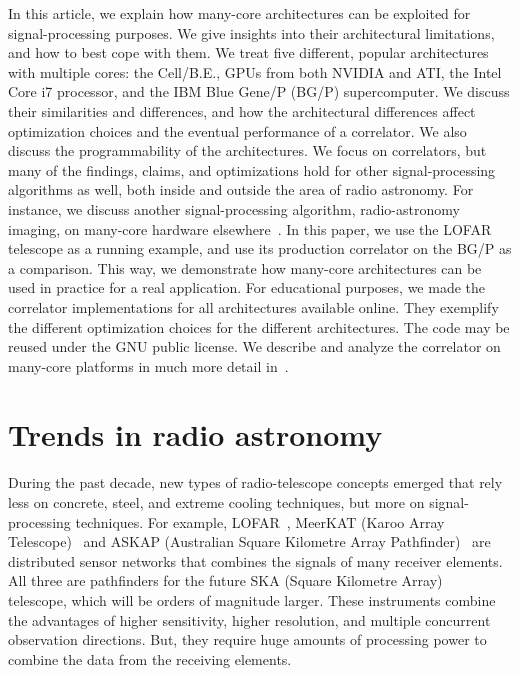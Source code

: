 \documentclass{article}
\begin{document}
In this article, we explain how many-core architectures can be
exploited for signal-processing purposes.  We give
insights into their architectural limitations, and how to best cope
with them.  We treat five different, popular architectures with
multiple cores: the \mbox{Cell/B.E.}, GPUs from both NVIDIA and ATI, the Intel Core i7 processor, and
the IBM Blue Gene/P (BG/P) supercomputer.  We discuss their
similarities and differences, and how the architectural differences
affect optimization choices and the eventual performance of a
correlator. We also discuss the programmability of the architectures.
We focus on correlators, but many of the
findings, claims, and optimizations hold for other signal-processing
algorithms as well, both inside and outside the area of radio astronomy.
For instance, we discuss another signal-processing algorithm, radio-astronomy imaging, on many-core
hardware elsewhere~\cite{gridding}. 
In this paper, we use the LOFAR telescope as a running example, and
use its production correlator on the BG/P as a comparison. This way,
we demonstrate how many-core architectures can be used in practice for a real
application.
For educational purposes, we made the correlator implementations for all architectures available online.
They exemplify the different optimization choices for the different architectures.
The code may be reused under the GNU public license.
We describe and analyze the correlator on many-core
platforms in much more detail in~\cite{Nieuwpoort:09}. 


\section{Trends in radio astronomy}

During the past decade, new types of radio-telescope concepts emerged that
rely less on concrete, steel, and extreme cooling techniques, but more on
signal-processing techniques.
For example, LOFAR~\cite{deVos:09}, MeerKAT (Karoo Array Telescope)~\cite{meerkat} and
ASKAP (Australian Square Kilometre Array Pathfinder)~\cite{askap}
are distributed sensor networks
that combines the signals of many receiver elements.
All three are pathfinders for the future SKA (Square Kilometre Array)~\cite{ska} telescope, which
will be orders of magnitude larger.
These
instruments combine the advantages of higher sensitivity, higher resolution,
and multiple concurrent observation directions.
But, they require huge
amounts of processing power to combine the data from the receiving elements.
\end{document}
